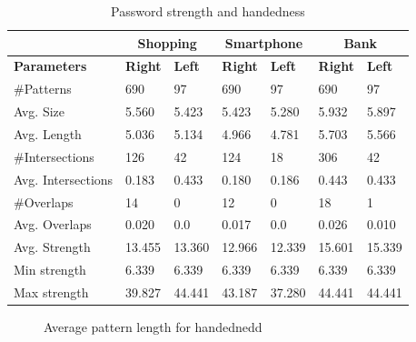 		\begin{table}[H]
      \centering
      \begin{tabular}{l || l | l || l | l || l | l }
        \hline
         & \multicolumn{2}{c||}{\bf Shopping} & \multicolumn{2}{c||}{\bf Smartphone} &\multicolumn{2}{c}{\bf Bank} \\ \hline
        {\bf Parameters}   & {\bf Right} & {\bf Left} & {\bf Right} & {\bf Left} & {\bf Right} & {\bf Left}\\ \hline
        \#Patterns         & 690 		& 97 			& 690 		& 97 			& 690    & 97     \\
        Avg. Size          & 5.560 	& 5.423 	& 5.423 	& 5.280 	& 5.932  & 5.897  \\
        Avg. Length        & 5.036 	& 5.134 	& 4.966 	& 4.781 	& 5.703  & 5.566  \\
        \#Intersections    & 126 		& 42 			& 124  		& 18 			& 306    & 42     \\
        Avg. Intersections & 0.183 	& 0.433 	& 0.180 	& 0.186 	& 0.443  & 0.433  \\
        \#Overlaps         & 14 		& 0 			& 12 			& 0 			& 18     & 1      \\
        Avg. Overlaps      & 0.020 	& 0.0 		& 0.017 	& 0.0 		& 0.026  & 0.010  \\ \hline
        Avg. Strength      & 13.455 & 13.360 	& 12.966 	& 12.339 	& 15.601 & 15.339 \\ 
        Min strength       & 6.339 	& 6.339 	& 6.339 	& 6.339 	& 6.339  & 6.339  \\
        Max strength       & 39.827	& 44.441 	& 43.187 	& 37.280 	& 44.441 & 44.441 \\ \hline
      \end{tabular}
      \caption{Password strength and handedness}
      \label{tab:handednessstrength} 
    \end{table}

    \begin{figure}[H]
    	\centering
    	\caption{Average pattern length for handednedd}
    	\label{fig:avgpatternlengthhandedness}
    \end{figure}

